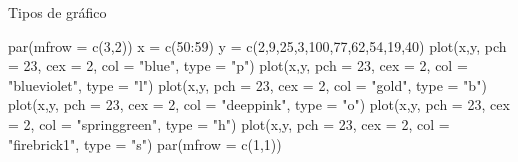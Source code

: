 \documentclass[
  ignorenonframetext,
  aspectratio=169]{beamer}
\newenvironment{Shaded}{\begin{snugshade}}{\end{snugshade}}
\newcommand{\AttributeTok}[1]{\textcolor[rgb]{0.77,0.63,0.00}{#1}}
\newcommand{\DecValTok}[1]{\textcolor[rgb]{0.00,0.00,0.81}{#1}}
\newcommand{\FunctionTok}[1]{\textcolor[rgb]{0.00,0.00,0.00}{#1}}
\newcommand{\NormalTok}[1]{#1}
\newcommand{\OtherTok}[1]{\textcolor[rgb]{0.56,0.35,0.01}{#1}}
\newcommand{\SpecialCharTok}[1]{\textcolor[rgb]{0.00,0.00,0.00}{#1}}
\newcommand{\StringTok}[1]{\textcolor[rgb]{0.31,0.60,0.02}{#1}}
\begin{document}
\begin{frame}[fragile]{Tipos de gráfico}
\protect\hypertarget{tipos-de-gruxe1fico}{}
\begin{Shaded}
\begin{Highlighting}[]
\FunctionTok{par}\NormalTok{(}\AttributeTok{mfrow =} \FunctionTok{c}\NormalTok{(}\DecValTok{3}\NormalTok{,}\DecValTok{2}\NormalTok{))}
\NormalTok{x }\OtherTok{=} \FunctionTok{c}\NormalTok{(}\DecValTok{50}\SpecialCharTok{:}\DecValTok{59}\NormalTok{)}
\NormalTok{y }\OtherTok{=} \FunctionTok{c}\NormalTok{(}\DecValTok{2}\NormalTok{,}\DecValTok{9}\NormalTok{,}\DecValTok{25}\NormalTok{,}\DecValTok{3}\NormalTok{,}\DecValTok{100}\NormalTok{,}\DecValTok{77}\NormalTok{,}\DecValTok{62}\NormalTok{,}\DecValTok{54}\NormalTok{,}\DecValTok{19}\NormalTok{,}\DecValTok{40}\NormalTok{)}
\FunctionTok{plot}\NormalTok{(x,y, }\AttributeTok{pch =} \DecValTok{23}\NormalTok{, }\AttributeTok{cex =} \DecValTok{2}\NormalTok{, }\AttributeTok{col =} \StringTok{"blue"}\NormalTok{, }\AttributeTok{type =} \StringTok{"p"}\NormalTok{)}
\FunctionTok{plot}\NormalTok{(x,y, }\AttributeTok{pch =} \DecValTok{23}\NormalTok{, }\AttributeTok{cex =} \DecValTok{2}\NormalTok{, }\AttributeTok{col =} \StringTok{"blueviolet"}\NormalTok{, }\AttributeTok{type =} \StringTok{"l"}\NormalTok{)}
\FunctionTok{plot}\NormalTok{(x,y, }\AttributeTok{pch =} \DecValTok{23}\NormalTok{, }\AttributeTok{cex =} \DecValTok{2}\NormalTok{, }\AttributeTok{col =} \StringTok{"gold"}\NormalTok{, }\AttributeTok{type =} \StringTok{"b"}\NormalTok{)}
\FunctionTok{plot}\NormalTok{(x,y, }\AttributeTok{pch =} \DecValTok{23}\NormalTok{, }\AttributeTok{cex =} \DecValTok{2}\NormalTok{, }\AttributeTok{col =} \StringTok{"deeppink"}\NormalTok{, }\AttributeTok{type =} \StringTok{"o"}\NormalTok{)}
\FunctionTok{plot}\NormalTok{(x,y, }\AttributeTok{pch =} \DecValTok{23}\NormalTok{, }\AttributeTok{cex =} \DecValTok{2}\NormalTok{, }\AttributeTok{col =} \StringTok{"springgreen"}\NormalTok{,}
     \AttributeTok{type =} \StringTok{"h"}\NormalTok{)}
\FunctionTok{plot}\NormalTok{(x,y, }\AttributeTok{pch =} \DecValTok{23}\NormalTok{, }\AttributeTok{cex =} \DecValTok{2}\NormalTok{, }\AttributeTok{col =} \StringTok{"firebrick1"}\NormalTok{,}
     \AttributeTok{type =} \StringTok{"s"}\NormalTok{)}
\FunctionTok{par}\NormalTok{(}\AttributeTok{mfrow =} \FunctionTok{c}\NormalTok{(}\DecValTok{1}\NormalTok{,}\DecValTok{1}\NormalTok{))}
\end{Highlighting}
\end{Shaded}
\end{frame}
\end{document}
